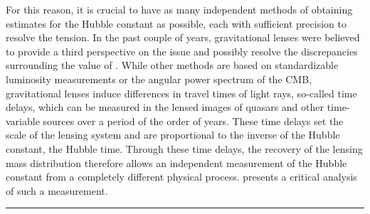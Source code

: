 For this reason, it is crucial to have as many independent methods of obtaining
estimates for the Hubble constant as possible, each with sufficient precision to
resolve the tension.  In the past couple of years, gravitational lenses were
believed to provide a third perspective on the issue and possibly resolve the
discrepancies surrounding the value of \Ho{}.  While other methods are based on
standardizable luminosity measurements or the angular power spectrum of the CMB,
gravitational lenses induce differences in travel times of light rays, so-called
time delays, which can be measured in the lensed images of quasars and other
time-variable sources over a period of the order of years.  These time delays
set the scale of the lensing system and are proportional to the inverse of the
Hubble constant, the Hubble time.  Through these time delays, the recovery of
the lensing mass distribution therefore allows an independent measurement of the
Hubble constant from a completely different physical process. 
 presents a critical analysis of such a measurement.

\par\noindent\rule{\textwidth}{0.8pt}

